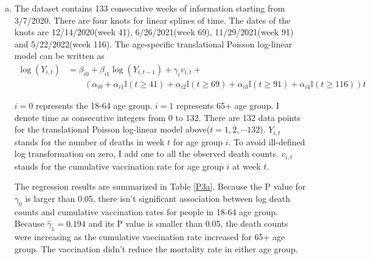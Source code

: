 \documentclass[12pt]{article}
\begin{document}
\begin{enumerate}[(a)]

\item The dataset contains 133 consecutive weeks of information starting from 3/7/2020. There are four knots for linear splines of time. The dates of the knots are 12/14/2020(week 41), 6/26/2021(week 69), 11/29/2021(week 91) and 5/22/2022(week 116). The age-specific translational Poisson log-linear model can be written as
\begin{align}
	\log(Y_{i, t}) &= \beta_{i0}+\beta_{i1}\log(Y_{i, t-1})+ \gamma_i v_{i, t} + \label{formulap3a} \\
	&\qquad \left(\alpha_{i0} + \alpha_{i1}\mathbb{I}(t \geq 41) + \alpha_{i2}\mathbb{I}(t \geq 69) +\alpha_{i3} \mathbb{I}(t \geq 91) + \alpha_{i4}\mathbb{I}(t \geq 116)\right)t	\nonumber
\end{align}

 $i=0$ represents the 18-64 age group. $i=1$ represents 65+ age group. I denote time as consecutive integers from 0 to 132. There are 132 data points for the translational Poisson log-linear model above($t=1,2,\cdots 132$). $Y_{i,t}$ stands for the number of deaths in week $t$ for age group $i$. To avoid ill-defined log transformation on zero, I add one to all the observed death counts. $v_{i,t}$ stands for the cumulative vaccination rate for age group $i$ at week $t$.
 
The regression results are summarized in Table \ref{P3a}. Because the P value for $\gamma_0$ is larger than 0.05, there isn't significant association between log death counts and cumulative vaccination rates for people in 18-64 age group. Because $\hat{\gamma}_1 =0.194$ and its P value is smaller than 0.05, the death counts were increasing as the cumulative vaccination rate increased for 65+ age group. The vaccination didn't reduce the mortality rate in either age group.


\end{enumerate}
\end{document}
